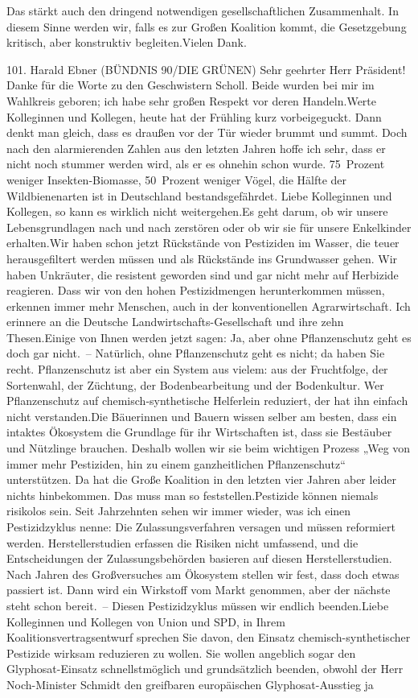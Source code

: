 \documentclass{article}
\begin{document}
Das stärkt auch den dringend notwendigen gesellschaftlichen Zusammenhalt. In diesem Sinne werden wir, falls es zur Großen Koalition kommt, die Gesetzgebung kritisch, aber konstruktiv begleiten.Vielen Dank.




	101. Harald Ebner (BÜNDNIS 90/DIE GRÜNEN) Sehr geehrter Herr Präsident! Danke für die Worte zu den Geschwistern Scholl. Beide wurden bei mir im Wahlkreis geboren; ich habe sehr großen Respekt vor deren Handeln.Werte Kolleginnen und Kollegen, heute hat der Frühling kurz vorbeigeguckt. Dann denkt man gleich, dass es draußen vor der Tür wieder brummt und summt. Doch nach den alarmierenden Zahlen aus den letzten Jahren hoffe ich sehr, dass er nicht noch stummer werden wird, als er es ohnehin schon wurde. 75 Prozent weniger Insekten-Biomasse, 50 Prozent weniger Vögel, die Hälfte der Wildbienenarten ist in Deutschland bestandsgefährdet. Liebe Kolleginnen und Kollegen, so kann es wirklich nicht weitergehen.Es geht darum, ob wir unsere Lebensgrundlagen nach und nach zerstören oder ob wir sie für unsere Enkelkinder erhalten.Wir haben schon jetzt Rückstände von Pestiziden im Wasser, die teuer herausgefiltert werden müssen und als Rückstände ins Grundwasser gehen. Wir haben Unkräuter, die resistent geworden sind und gar nicht mehr auf Herbizide reagieren. Dass wir von den hohen Pestizidmengen herunterkommen müssen, erkennen immer mehr Menschen, auch in der konventionellen Agrarwirtschaft. Ich erinnere an die Deutsche Landwirtschafts-Gesellschaft und ihre zehn Thesen.Einige von Ihnen werden jetzt sagen: Ja, aber ohne Pflanzenschutz geht es doch gar nicht. – Natürlich, ohne Pflanzenschutz geht es nicht; da haben Sie recht. Pflanzenschutz ist aber ein System aus vielem: aus der Fruchtfolge, der Sortenwahl, der Züchtung, der Bodenbearbeitung und der Bodenkultur. Wer Pflanzenschutz auf chemisch-synthetische Helferlein reduziert, der hat ihn einfach nicht verstanden.Die Bäuerinnen und Bauern wissen selber am besten, dass ein intaktes Ökosystem die Grundlage für ihr Wirtschaften ist, dass sie Bestäuber und Nützlinge brauchen. Deshalb wollen wir sie beim wichtigen Prozess „Weg von immer mehr Pestiziden, hin zu einem ganzheitlichen Pflanzenschutz“ unterstützen. Da hat die Große Koalition in den letzten vier Jahren aber leider nichts hinbekommen. Das muss man so feststellen.Pestizide können niemals risikolos sein. Seit Jahrzehnten sehen wir immer wieder, was ich einen Pestizidzyklus nenne: Die Zulassungsverfahren versagen und müssen reformiert werden. Herstellerstudien erfassen die Risiken nicht umfassend, und die Entscheidungen der Zulassungsbehörden basieren auf diesen Herstellerstudien. Nach Jahren des Großversuches am Ökosystem stellen wir fest, dass doch etwas passiert ist. Dann wird ein Wirkstoff vom Markt genommen, aber der nächste steht schon bereit. – Diesen Pestizidzyklus müssen wir endlich beenden.Liebe Kolleginnen und Kollegen von Union und SPD, in Ihrem Koalitionsvertragsentwurf sprechen Sie davon, den Einsatz chemisch-synthetischer Pestizide wirksam reduzieren zu wollen. Sie wollen angeblich sogar den Glyphosat-Einsatz schnellstmöglich und grundsätzlich beenden, obwohl der Herr Noch-Minister Schmidt den greifbaren europäischen Glyphosat-Ausstieg ja 
\end{document}
